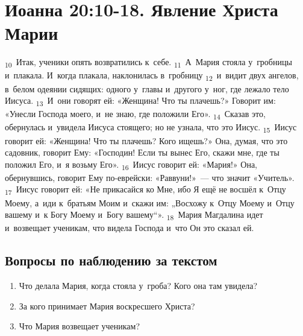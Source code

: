 \documentclass[a4paper,12pt]{article}
\begin{document}

\section{Иоанна 20:10-18. Явление Христа Марии}

\textsubscript{10}~Итак, ученики опять возвратились к~себе.
\textsubscript{11}~А~Мария стояла у~гробницы и~плакала. И~когда плакала, наклонилась в~гробницу
\textsubscript{12}~и~видит двух ангелов, в~белом одеянии сидящих: одного у~главы и~другого у~ног, где лежало тело Иисуса.
\textsubscript{13}~И~они говорят ей: «Женщина! Что ты плачешь?» Говорит им: «Унесли Господа моего, и~не знаю, где положили Его».
\textsubscript{14}~Сказав это, обернулась и~увидела Иисуса стоящего; но не узнала, что это Иисус.
\textsubscript{15}~Иисус говорит ей: «Женщина! Что ты плачешь? Кого ищешь?» Она, думая, что это садовник, говорит Ему: «Господин! Если ты вынес Его, скажи мне, где ты положил Его, и~я возьму Его».
\textsubscript{16}~Иисус говорит ей: «Мария!» Она, обернувшись, говорит Ему по-еврейски: «Раввуни!»~--- что значит «Учитель».
\textsubscript{17}~Иисус говорит ей: «Не прикасайся ко Мне, ибо Я ещё не восшёл к~Отцу Моему, а~иди к~братьям Моим и~скажи им: „Восхожу к~Отцу Моему и~Отцу вашему и~к Богу Моему и~Богу вашему“».
\textsubscript{18}~Мария Магдалина идет и~возвещает ученикам, что видела Господа и~что Он это сказал ей. 

\subsection*{Вопросы по наблюдению за текстом}
\begin{enumerate}
    \item Что делала Мария, когда стояла у~гроба? Кого она там увидела? 
    
    \myline
    
    \myline
    \item За кого принимает Мария воскресшего Христа? 
    
    \myline
    
    \myline
    \item Что Мария возвещает ученикам? 
    
    \myline
    
    \myline
\end{enumerate}
\end{document}
